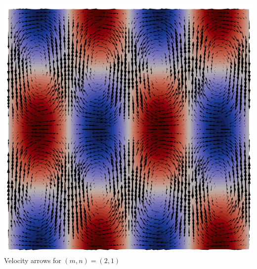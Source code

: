 \begin{center}
\includegraphics[width=14cm]{python_codes/fieldstone_32/results/vel_2x1}\\
{\small Velocity arrows for $(m,n)=(2,1)$}
\end{center}
